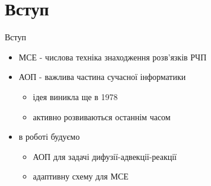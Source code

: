 
\section*{Вступ}
\begin{frame}{Вступ}
	\begin{itemize}
		\item МСЕ - числова техніка знаходження розв'язків РЧП
		\item АОП - важлива частина сучасної інформатики
			\begin{itemize}
				\item{ідея виникла ще в 1978 }
				\item активно розвиваються останнім часом \cite{ainsworth2011posteriori, eriksson1995introduction,verfurth1994posteriori,verfurth1996review}
			\end{itemize}
		\item в роботі будуємо
			\begin{itemize}
				\item АОП для задачі дифузії-адвекції-реакції
				\item адаптивну схему для МСЕ
			\end{itemize}
	\end{itemize}
\end{frame}

